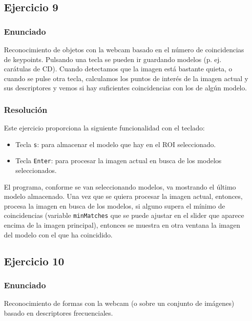 \documentclass[a4paper,10pt,titlepage,oneside,openright]{book}
\begin{document}
\medskip
\subsection{Ejercicio 9}

\subsubsection*{Enunciado}
Reconocimiento de objetos con la webcam basado en el número de coincidencias de keypoints. Pulsando una tecla se pueden ir guardando modelos (p. ej. carátulas de CD). Cuando detectamos que la imagen está bastante quieta, o cuando se pulse otra tecla, calculamos los puntos de interés de la imagen actual y sus descriptores y vemos si hay suficientes coincidencias con los de algún modelo.

\subsubsection*{Resolución}
Este ejercicio proporciona la siguiente funcionalidad con el teclado:
\begin{itemize}
 \item Tecla \texttt{s}: para almacenar el modelo que hay en el ROI seleccionado.
 \item Tecla \texttt{Enter}: para procesar la imagen actual en busca de los modelos seleccionados.
\end{itemize}

El programa, conforme se van seleccionando modelos, va mostrando el último modelo almacenado. Una vez que se quiera procesar la imagen actual, entonces, procesa la imagen en busca de los modelos, si alguno supera el mínimo de coincidencias (variable \texttt{minMatches} que se puede ajustar en el slider que aparece encima de la imagen principal), entonces se muestra en otra ventana la imagen del modelo con el que ha coincidido.


\medskip
\subsection{Ejercicio 10}

\subsubsection*{Enunciado}
Reconocimiento de formas con la webcam (o sobre un conjunto de imágenes) basado en descriptores frecuenciales.
\end{document}
